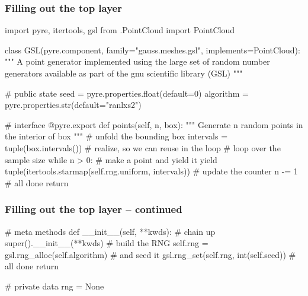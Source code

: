 \begin{frame}[fragile]
%
  \frametitle{Filling out the top layer}
%
  \begin{ipython}[basicstyle=\tt\tiny]{}
import pyre, itertools, gsl
from .PointCloud import PointCloud

class GSL(pyre.component, family="gauss.meshes.gsl", implements=PointCloud):
    """
    A point generator implemented using the large set of random number
    generators available as part of the gnu scientific library (GSL)
    """

    # public state
    seed = pyre.properties.float(default=0)
    algorithm = pyre.properties.str(default="ranlxs2")
    
    # interface
    @pyre.export
    def points(self, n, box):
        """
        Generate {n} random points in the interior of {box}
        """
        # unfold the bounding box
        intervals = tuple(box.intervals()) # realize, so we can reuse in the loop
        # loop over the sample size
        while n > 0:
            # make a point and yield it
            yield tuple(itertools.starmap(self.rng.uniform, intervals))
            # update the counter
            n -= 1
        # all done
        return
  \end{ipython}
%
\end{frame}

\begin{frame}[fragile]
%
  \frametitle{Filling out the top layer -- continued}
%
  \begin{ipython}{}
    # meta methods
    def __init__(self, **kwds):
        # chain up
        super().__init__(**kwds)
        # build the RNG
        self.rng = gsl.rng_alloc(self.algorithm)
        # and seed it
        gsl.rng_set(self.rng, int(self.seed))
        # all done
        return

    # private data
    rng = None
  \end{ipython}
%
\end{frame}


